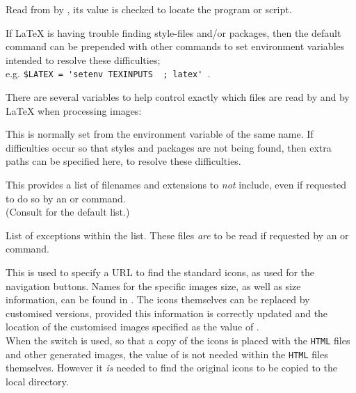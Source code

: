 \begin{htmllist}
\item [\fn{\$LATEX}\texttt{ = 'latex';}]
Read from  by ,
its value is checked to locate the  program or script.

\smallskip\noindent
If \LaTeX{} is having trouble finding style-files and/or packages, then
the default command can be prepended with other commands
to set environment variables intended to resolve these difficulties;\\
e.g.
\verb|$LATEX = 'setenv TEXINPUTS |\verb| ; latex' |.

There are several variables to help control exactly which files are
read by \latextohtml{} and by \LaTeX{} when processing images:

\begin{htmllist}%
\item [\fn{\$TEXINPUTS}]
This is normally set from the environment variable of the same name.
If difficulties occur so that styles and packages are not being found,
then extra paths can be specified here, to resolve these difficulties.

\item [\fn{\$DONT\_INCLUDE}]
This provides a list of filenames and extensions to \emph{not} include,
even if requested to do so by an  or  command.\\
(Consult  for the default list.)

\item [\fn{\$DO\_INCLUDE}\texttt{ = '';}]
List of exceptions within the  list.
These files \emph{are} to be read if requested by an 
or  command.
\end{htmllist}


\item [\fn{\$ICONSERVER}\texttt{ = '\Meta{URL}';}]
This is used to specify a URL to find the standard icons, as used for the
navigation buttons.\html{\\}
Names for the specific images size, as well as size information,
can be found in . The icons themselves can be replaced
by customised versions, provided this information is correctly updated
and the location of the customised images specified as the value
of .\\
When the  switch is used,
so that a copy of the icons is placed with the \texttt{HTML} files and other
generated images, the value of  is not needed within
the \texttt{HTML} files themselves. However it \emph{is} needed to find
the original icons to be copied to the local directory.


\end{htmllist}
